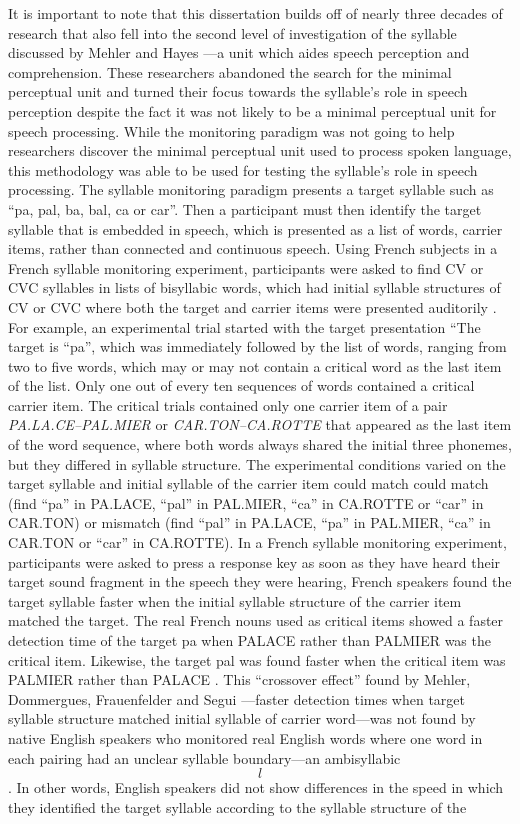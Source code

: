 It is important to note that this dissertation builds off of nearly three decades of research that also fell into the second level of investigation of the syllable discussed by Mehler and Hayes \parencite*{Mehler1981-wp}---a unit which aides speech perception and comprehension. These researchers abandoned the search for the minimal perceptual unit and turned their focus towards the syllable’s role in speech perception despite the fact it was not likely to be a minimal perceptual unit for speech processing. While the monitoring paradigm was not going to help researchers discover the minimal perceptual unit used to process spoken language, this methodology was able to be used for testing the syllable’s role in speech processing. The syllable monitoring paradigm presents a target syllable such as “pa, pal, ba, bal, ca or car”. Then a participant must then identify the target syllable that is embedded in speech, which is presented as a list of words, carrier items, rather than connected and continuous speech. Using French subjects in a French syllable monitoring experiment, participants were asked to find CV or CVC syllables in lists of bisyllabic words, which had initial syllable structures of CV or CVC where both the target and carrier items were presented auditorily \parencite{Mehler1981-vi}. For example, an experimental trial started with the target presentation “The target is “pa”, which was immediately followed by the list of words, ranging from two to five words, which may or may not contain a critical word as the last item of the list. Only one out of every ten sequences of words contained a critical carrier item. The critical trials contained only one carrier item of a pair \emph{PA.LA.CE–PAL.MIER} or \emph{CAR.TON–CA.ROTTE} that appeared as the last item of the word sequence, where both words always shared the initial three phonemes, but they differed in syllable structure. The experimental conditions varied on the target syllable and initial syllable of the carrier item could match could match (find “pa” in PA.LACE, “pal” in PAL.MIER, “ca” in CA.ROTTE or “car” in CAR.TON) or mismatch (find “pal” in PA.LACE, “pa” in PAL.MIER, “ca” in CAR.TON or “car” in CA.ROTTE).  In a French syllable monitoring experiment, participants were asked to press a response key as soon as they have heard their target sound fragment in the speech they were hearing, French speakers found the target syllable faster when the initial syllable structure of the carrier item matched the target. The real French nouns used as critical items showed a faster detection time of the target pa when PALACE rather than PALMIER was the critical item. Likewise, the target pal was found faster when the critical item was  PALMIER rather than PALACE \citep{Mehler1981-vi}. This “crossover effect” found by Mehler, Dommergues, Frauenfelder and Segui \parencite*{Mehler1981-vi}---faster detection times when target syllable structure matched initial syllable of carrier word---was not found by native English speakers who monitored real English words where one word in each pairing had an unclear syllable boundary---an ambisyllabic \[l\] \parencite{Cutler1986-zl}. In other words, English speakers did not show differences in the speed in which they identified the target syllable according to the syllable structure of the 